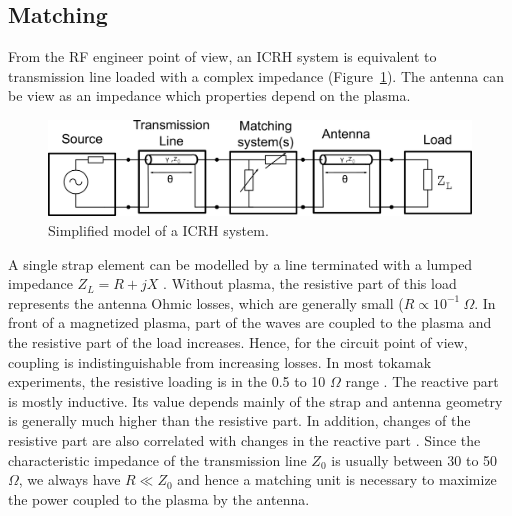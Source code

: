\subsection{Matching}\label{sec:ICRH_matching_systems}
From the RF engineer point of view, an ICRH system is equivalent to transmission line loaded with a complex impedance (Figure~\ref{fig:icrhantennacircuitmodel}). The antenna can be view as an impedance which properties depend on the plasma. 

\begin{figure}[h]
	\centering
	\includegraphics[width=0.9\linewidth]{figures/chap3/ICRH_antenna_circuit_model}
	\caption{Simplified model of a ICRH system.}
	\label{fig:icrhantennacircuitmodel}
\end{figure}

A single strap element can be modelled by a line terminated with a lumped impedance $Z_L = R + j X$ . Without plasma, the resistive part of this load represents the antenna Ohmic losses, which are generally small ($R \propto 10^{-1}~\si{\Omega}$. In front of a magnetized plasma, part of the waves are coupled to the plasma and the resistive part of the load increases. Hence, for the circuit point of view, coupling is indistinguishable from increasing losses. In most tokamak experiments, the resistive loading is in the 0.5 to 10 $\si{\Omega}$ range . The reactive part is mostly inductive. Its value depends mainly of the strap and antenna geometry is generally much higher than the resistive part. In addition, changes of the resistive part are also correlated with changes in the reactive part \cite{pinsker1998}. Since the characteristic impedance of the transmission line $Z_0$ is usually between 30 to 50~$\si{\Omega}$, we always have $R \ll Z_0$ and hence a matching unit is necessary to maximize the power coupled to the plasma by the antenna.

